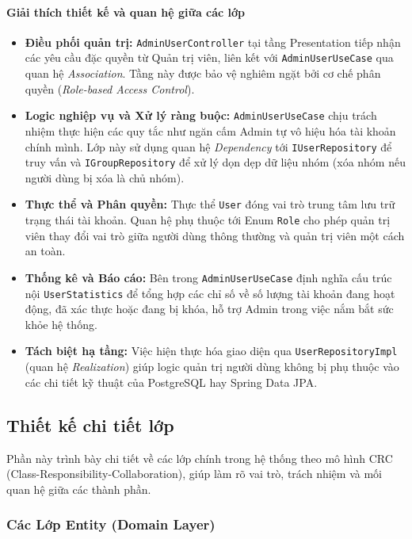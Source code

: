 \paragraph{Giải thích thiết kế và quan hệ giữa các lớp}
\begin{itemize}
    \item \textbf{Điều phối quản trị:} \texttt{AdminUserController} tại tầng Presentation tiếp nhận các yêu cầu đặc quyền từ Quản trị viên, liên kết với \texttt{AdminUserUseCase} qua quan hệ \textit{Association}. Tầng này được bảo vệ nghiêm ngặt bởi cơ chế phân quyền (\textit{Role-based Access Control}).
    \item \textbf{Logic nghiệp vụ và Xử lý ràng buộc:} \texttt{AdminUserUseCase} chịu trách nhiệm thực hiện các quy tắc như ngăn cấm Admin tự vô hiệu hóa tài khoản chính mình. Lớp này sử dụng quan hệ \textit{Dependency} tới \texttt{IUserRepository} để truy vấn và \texttt{IGroupRepository} để xử lý dọn dẹp dữ liệu nhóm (xóa nhóm nếu người dùng bị xóa là chủ nhóm).
    \item \textbf{Thực thể và Phân quyền:} Thực thể \texttt{User} đóng vai trò trung tâm lưu trữ trạng thái tài khoản. Quan hệ phụ thuộc tới Enum \texttt{Role} cho phép quản trị viên thay đổi vai trò giữa người dùng thông thường và quản trị viên một cách an toàn.
    \item \textbf{Thống kê và Báo cáo:} Bên trong \texttt{AdminUserUseCase} định nghĩa cấu trúc nội \texttt{UserStatistics} để tổng hợp các chỉ số về số lượng tài khoản đang hoạt động, đã xác thực hoặc đang bị khóa, hỗ trợ Admin trong việc nắm bắt sức khỏe hệ thống.
    \item \textbf{Tách biệt hạ tầng:} Việc hiện thực hóa giao diện qua \texttt{UserRepositoryImpl} (quan hệ \textit{Realization}) giúp logic quản trị người dùng không bị phụ thuộc vào các chi tiết kỹ thuật của PostgreSQL hay Spring Data JPA.
\end{itemize}
\subsection{Thiết kế chi tiết lớp}

Phần này trình bày chi tiết về các lớp chính trong hệ thống theo mô hình CRC (Class-Responsibility-Collaboration), giúp làm rõ vai trò, trách nhiệm và mối quan hệ giữa các thành phần.

\subsubsection{Các Lớp Entity (Domain Layer)}

